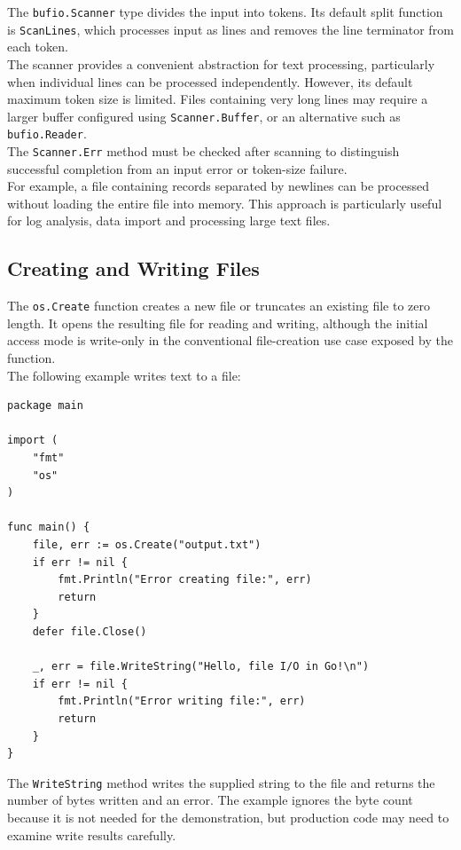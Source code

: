 The \texttt{bufio.Scanner} type divides the input into tokens. Its default split function is \texttt{ScanLines}, which processes input as lines and removes the line terminator from each token.\\

The scanner provides a convenient abstraction for text processing, particularly when individual lines can be processed independently. However, its default maximum token size is limited. Files containing very long lines may require a larger buffer configured using \texttt{Scanner.Buffer}, or an alternative such as \texttt{bufio.Reader}.\\

The \texttt{Scanner.Err} method must be checked after scanning to distinguish successful completion from an input error or token-size failure.\\

For example, a file containing records separated by newlines can be processed without loading the entire file into memory. This approach is particularly useful for log analysis, data import and processing large text files.\\

\subsection{Creating and Writing Files}

The \texttt{os.Create} function creates a new file or truncates an existing file to zero length. It opens the resulting file for reading and writing, although the initial access mode is write-only in the conventional file-creation use case exposed by the function.\\

The following example writes text to a file:

\begin{lstlisting}
package main

import (
    "fmt"
    "os"
)

func main() {
    file, err := os.Create("output.txt")
    if err != nil {
        fmt.Println("Error creating file:", err)
        return
    }
    defer file.Close()

    _, err = file.WriteString("Hello, file I/O in Go!\n")
    if err != nil {
        fmt.Println("Error writing file:", err)
        return
    }
}
\end{lstlisting}

The \texttt{WriteString} method writes the supplied string to the file and returns the number of bytes written and an error. The example ignores the byte count because it is not needed for the demonstration, but production code may need to examine write results carefully.\\

